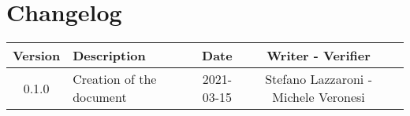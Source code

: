\section*{Changelog}

\begin{center}
	\begin{longtable}{|c|p{5cm}|c|c|c|}
	\hline
	\rowcolor{lighter-grayer}
	\textbf{Version} & \textbf{Description} & \textbf{Date} & \textbf{Writer - Verifier} \\
	\hline
	\endfirsthead


	\hline
	0.1.0 & Creation of the document & 2021-03-15 & Stefano Lazzaroni - Michele Veronesi\\
	
	\hline

	\end{longtable}
\end{center}